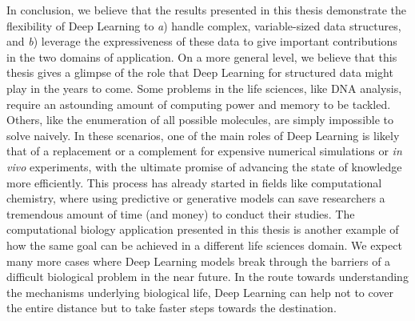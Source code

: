 \vspace{1em}

In conclusion, we believe that the results presented in this thesis demonstrate the flexibility of Deep Learning to \emph{a}) handle complex, variable-sized data structures, and \emph{b}) leverage the expressiveness of these data to give important contributions in the two domains of application. On a more general level, we believe that this thesis gives a glimpse of the role that Deep Learning for structured data might play in the years to come. Some problems in the life sciences, like DNA analysis, require an astounding amount of computing power and memory to be tackled. Others, like the enumeration of all possible molecules, are simply impossible to solve naively. In these scenarios, one of the main roles of Deep Learning is likely that of a replacement or a complement for expensive numerical simulations or \emph{in vivo} experiments, with the ultimate promise of advancing the state of knowledge more efficiently. This process has already started in fields like computational chemistry, where using predictive or generative models can save researchers a tremendous amount of time (and money) to conduct their studies. The computational biology application presented in this thesis is another example of how the same goal can be achieved in a different life sciences domain. We expect many more cases where Deep Learning models break through the barriers of a difficult biological problem in the near future. In the route towards understanding the mechanisms underlying biological life, Deep Learning can help not to cover the entire distance but to take faster steps towards the destination.